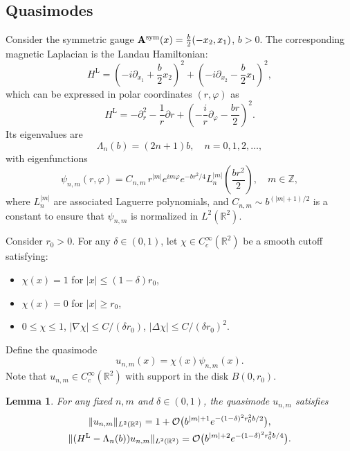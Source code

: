 \documentclass[11pt]{amsart}
\newtheorem{lemma}[theorem]{Lemma}
\theoremstyle{remark}
\newcommand{\bA}{\mathbf{A}}
\newcommand{\R}{\mathbb{R}}
\numberwithin{equation}{section}
\begin{document}
\subsection{Quasimodes}\label{sec:quasimodes}



Consider  the symmetric gauge $\bA^{\rm sym}(x) = \frac{b}{2}(-x_2, x_1)$, $b>0$. The corresponding magnetic Laplacian  is the Landau Hamiltonian:
\[
H^{\text{L}} = \left(-i\partial_{x_1} + \frac{b}{2}x_2\right)^2 + \left(-i\partial_{x_2} - \frac{b}{2}x_1\right)^2,
\]
which can be expressed in polar coordinates $(r,\varphi)$ as
\[H^{\text{L}}=-\partial_r^2-\frac1r\partial r+\left(-\frac{i}{r}\partial_\varphi-\frac{br}{2}\right)^2.\]
Its eigenvalues are
\[
\Lambda_n(b) = (2n+1)b, \quad n = 0,1,2,\dots,
\]
with eigenfunctions
\[
\psi_{n,m}(r,\varphi) = C_{n,m} \, r^{|m|} e^{im\varphi} e^{-b r^2/4} L_n^{|m|}\left(\frac{b r^2}{2}\right), \quad m \in \mathbb{Z},
\]
where $L_n^{|m|}$ are associated Laguerre polynomials, and $C_{n,m} \sim b^{(|m|+1)/2}$ is a constant to ensure that $\psi_{n,m}$ is normalized in $L^2(\R^2)$. \medskip

Consider $r_0>0$. For any $\delta \in (0,1)$, let $\chi \in C_c^\infty(\mathbb{R}^2)$ be a smooth cutoff satisfying:
\begin{itemize}
    \item $\chi(x) = 1$ for $|x| \le (1-\delta)r_0$,
    \item $\chi(x) = 0$ for $|x| \ge r_0$,
    \item $0 \le \chi \le 1$, $|\nabla \chi| \le C/(\delta r_0)$, $|\Delta \chi| \le C/(\delta r_0)^2$.
\end{itemize}

Define the quasimode
\[
u_{n,m}(x) = \chi(x) \psi_{n,m}(x).
\]
Note that $u_{n,m}\in C_c^\infty(\R^2)$ with support in the disk $B(0,r_0)$.

\begin{lemma}\label{lem:quasimode}
For any fixed $n,m$ and $\delta \in (0,1)$, the quasimode $u_{n,m}$ satisfies
\[\begin{gathered}
    \|u_{n,m}\|_{L^2(\R^2)} = 1 + \mathcal O\big( b^{|m|+1}e^{- (1-\delta)^2 r_0^2b/2} \big) ,\\
    \|(H^{\rm L}-\Lambda_n(b))u_{n,m}\|_{L^2(\R^2)} = \mathcal O\big(b^{|m|+2} e^{- (1-\delta)^2 r_0^2b/4} \big).
\end{gathered}
\]
\end{lemma}
\end{document}
